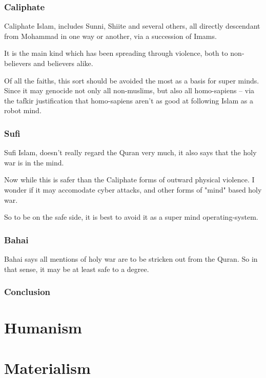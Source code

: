 \subsection{Caliphate}
Caliphate Islam, includes Sunni, Shiite and several others,  all directly
descendant from Mohammad in one way or another, via a succession of Imams. 

It is the main kind which has been spreading through violence, both to
non-believers and believers alike. 

Of all the faiths, this sort should be avoided the most as a basis for super
minds.  Since it may genocide not only all non-muslims, but also all
homo-sapiens -- via the tafkir justification that homo-sapiens aren't as good at
following Islam as a robot mind. 

\subsection{Sufi}

Sufi Islam, doesn't really regard the Quran very much,
it also says that the holy war is in the mind. 

Now while this is safer than the Caliphate forms of outward physical violence. 
I wonder if it may accomodate cyber attacks, and other forms of "mind" based
holy war. 

So to be on the safe side, it is best to avoid it as a super mind
operating-system.

\subsection{Bahai}

Bahai says all mentions of holy war are to be stricken out from the Quran. 
So in that sense, it may be at least safe to a degree.
\subsection{Conclusion}
\chapter{Humanism}
\chapter{Materialism}
